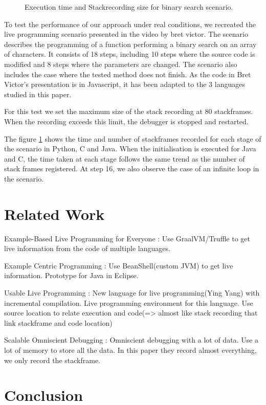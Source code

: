 \documentclass[english,submission]{programming}
\begin{document}
\begin{figure}[htbp]
  \caption{Execution time and Stackrecording size for binary search scenario.}
  \label{fig:scenario-bs}
\end{figure}


To test the performance of our approach under real conditions, we recreated the live programming scenario presented in the video by bret victor. 
The scenario describes the programming of a function performing a binary search on an array of characters. It consists of 18 steps, including 10 steps where the source code is modified and 8 steps where the parameters are changed. 
The scenario also includes the case where the tested method does not finish. As the code in Bret Victor's presentation is in Javascript, it has been adapted to the 3 languages studied in this paper.

For this test we set the maximum size of the stack recording at 80 stackframes. When the recording exceeds this limit, the debugger is stopped and restarted.

The figure \ref{fig:scenario-bs} shows the time and number of stackframes recorded for each stage of the scenario in Python, C and Java. 
When the initialisation is executed for Java and C, the time taken at each stage follows the same trend as the number of stack frames registered. 
At step 16, we also observe the case of an infinite loop in the scenario.




\section{Related Work}
\label{sec:related-work}

Example-Based Live Programming for Everyone\cite{10.1145/3426428.3426919} : Use GraalVM/Truffle to get live information from the code of multiple languages.

Example Centric Programming\cite{10.1145/1052883.1052894} : Use BeanShell(custom JVM) to get live information. Prototype for Java in Eclipse.

Usable Live Programming\cite{10.1145/2509578.2509585} : New language for live programming(Ying Yang) with incremental compilation. Live programming environment for this language.
Use source location to relate execution and code(=> almost like stack recording that link stackframe and code location)

Scalable Omniscient Debugging\cite{10.1145/1297105.1297067} : Omniscient debugging with a lot of data. Use a lot of memory to store all the data.
In this paper they record almost everything, we only record the stackframe.

\section{Conclusion}
\label{sec:conclusion}

\printbibliography
\end{document}
